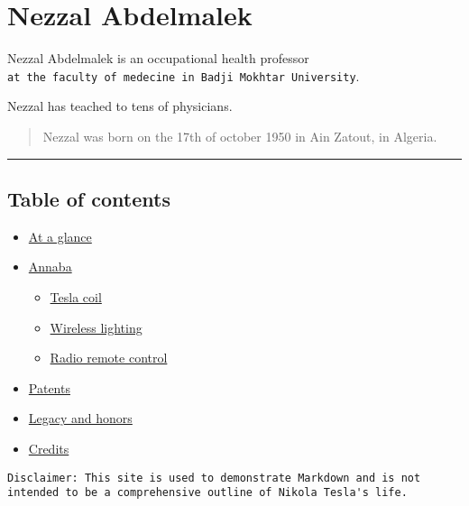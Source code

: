 \documentclass[
]{article}
\author{}
\date{}
\providecommand{\tightlist}{%
  \setlength{\itemsep}{0pt}\setlength{\parskip}{0pt}}
\begin{document}
\hypertarget{nezzal-abdelmalek}{%
\section{Nezzal Abdelmalek}\label{nezzal-abdelmalek}}

Nezzal Abdelmalek is an occupational health professor
\texttt{at\ the\ faculty\ of\ medecine\ in\ Badji\ Mokhtar\ University}.

Nezzal has teached to tens of physicians.

\begin{quote}
Nezzal was born on the 17th of october 1950 in Ain Zatout, in Algeria.
\end{quote}

\begin{center}\rule{0.5\linewidth}{0.5pt}\end{center}

\hypertarget{table-of-contents}{%
\subsection{Table of contents}\label{table-of-contents}}

\begin{itemize}
\tightlist
\item
  \protect\hyperlink{at-a-glance}{At a glance}
\item
  \protect\hyperlink{new-york-laboratories}{Annaba}

  \begin{itemize}
  \tightlist
  \item
    \protect\hyperlink{tesla-coil}{Tesla coil}
  \item
    \protect\hyperlink{wireless-lighting}{Wireless lighting}
  \item
    \protect\hyperlink{radio-remote-control}{Radio remote control}\\
  \end{itemize}
\item
  \protect\hyperlink{patents}{Patents}\\
\item
  \protect\hyperlink{legacy-and-honors}{Legacy and honors}\\
\item
  \protect\hyperlink{credits}{Credits}
\end{itemize}

\begin{verbatim}
Disclaimer: This site is used to demonstrate Markdown and is not intended to be a comprehensive outline of Nikola Tesla's life. 
\end{verbatim}
\end{document}
